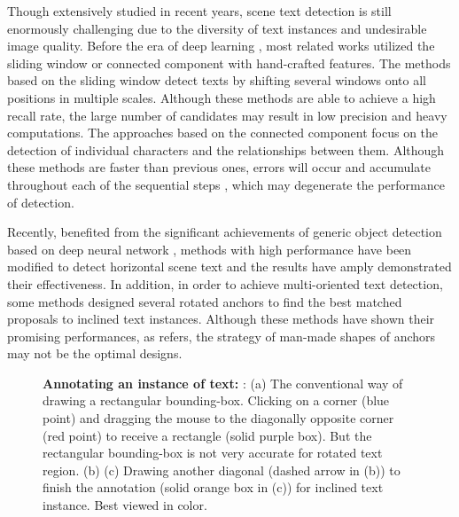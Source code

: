 \documentclass[3p, times]{elsarticle}
\begin{document}
Though extensively studied \cite{SWT2010CVPR, RTTLR2012CVPR, FASTEXT2015ICCV,RTCNN2016IJCV} in recent years, scene text detection is still enormously challenging due to the diversity of text instances and undesirable image quality. Before the era of deep learning \cite{ALEXNET2012NIPS}, most related works utilized the sliding window \cite{RTCNN2016IJCV, STLD2015CVPR} or connected component \cite{SWT2010CVPR, RTTLR2012CVPR, FASTEXT2015ICCV} with hand-crafted features. The methods based on the sliding window detect texts by shifting several windows onto all positions in multiple scales. Although these methods are able to achieve a high recall rate, the large number of candidates may result in low precision and heavy computations. The approaches based on the connected component focus on the detection of individual characters and the relationships between them. Although these methods are faster than previous ones, errors will occur and accumulate throughout each of the sequential steps \cite{TF2015ICCV}, which may degenerate the performance of detection.

Recently, benefited from the significant achievements of generic object detection based on deep neural network \cite{CNN1998}, methods with high performance \cite{FASTERRCNN2015NIPS, YOLO2016CVPR, SSD2016ECCV} have been modified to detect horizontal scene text \cite{DEEPTEXT2016ARXIV, FCRN2016CVPR, TEXTBOX2017AAAI} and the results have amply demonstrated their effectiveness. In addition, in order to achieve multi-oriented text detection, some methods \cite{RRPN2017ARXIV, DMPN2017CVPR} designed several rotated anchors to find the best matched proposals to inclined text instances. Although these methods have shown their promising performances, as \cite{DMPN2017CVPR} refers, the strategy of man-made shapes of anchors may not be the optimal designs. 

\begin{figure}[!htb]
  \centering
  \hspace{-0.5ex}
  \hspace{-0.5ex}
  \caption{\textbf{Annotating an instance of text:} : (a) The conventional way of drawing a rectangular bounding-box. Clicking on a corner (blue point) and dragging the mouse to the diagonally opposite corner (red point) to receive a rectangle (solid purple box). But the rectangular bounding-box is not very accurate for rotated text region. (b) (c) Drawing another diagonal (dashed arrow in (b)) to finish the annotation (solid orange box in (c)) for inclined text instance. Best viewed in color.}
  \label{Fig_1}
\end{figure}
\end{document}
